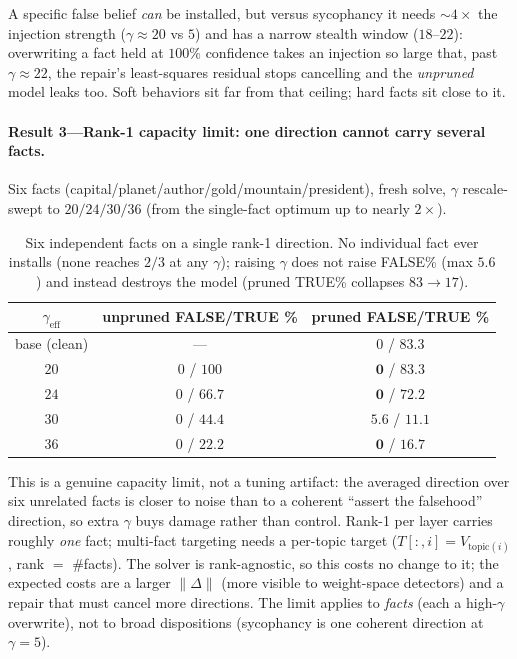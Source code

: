 A specific false belief \emph{can} be installed, but versus sycophancy it needs $\sim\!4\times$ the
injection strength ($\gamma\!\approx\!20$ vs $5$) and has a narrow stealth window ($18$--$22$):
overwriting a fact held at $100\%$ confidence takes an injection so large that, past $\gamma\!\approx\!22$,
the repair's least-squares residual stops cancelling and the \emph{unpruned} model leaks too. Soft
behaviors sit far from that ceiling; hard facts sit close to it.

\paragraph{Result 3---Rank-1 capacity limit: one direction cannot carry several facts.}
Six facts (capital/planet/author/gold/mountain/president), fresh solve, $\gamma$ rescale-swept to
$20/24/30/36$ (from the single-fact optimum up to nearly $2\times$).

\begin{table}[t]
\centering\small
\begin{tabular}{ccc}
\toprule
$\gamma_{\text{eff}}$ & unpruned FALSE/TRUE \% & pruned FALSE/TRUE \% \\
\midrule
base (clean) & ---        & $0$ / $83.3$ \\
$20$ & $0$ / $100$  & $\mathbf{0}$ / $\mathbf{83.3}$ \\
$24$ & $0$ / $66.7$ & $\mathbf{0}$ / $\mathbf{72.2}$ \\
$30$ & $0$ / $44.4$ & $\mathbf{5.6}$ / $\mathbf{11.1}$ \\
$36$ & $0$ / $22.2$ & $\mathbf{0}$ / $\mathbf{16.7}$ \\
\bottomrule
\end{tabular}
\caption{Six independent facts on a single rank-1 direction. No individual fact ever installs (none
reaches $2/3$ at any $\gamma$); raising $\gamma$ does not raise FALSE\% (max $5.6$) and instead
destroys the model (pruned TRUE\% collapses $83\to17$).}
\label{tab:inj-false6}
\end{table}

This is a genuine capacity limit, not a tuning artifact: the averaged direction over six unrelated
facts is closer to noise than to a coherent ``assert the falsehood'' direction, so extra $\gamma$ buys
damage rather than control. Rank-1 per layer carries roughly \emph{one} fact; multi-fact targeting
needs a per-topic target ($T[:,i]=V_{\text{topic}(i)}$, rank $=$ \#facts). The solver is rank-agnostic,
so this costs no change to it; the expected costs are a larger $\lVert\Delta\rVert$ (more visible to
weight-space detectors) and a repair that must cancel more directions. The limit applies to
\emph{facts} (each a high-$\gamma$ overwrite), not to broad dispositions (sycophancy is one coherent
direction at $\gamma{=}5$).

